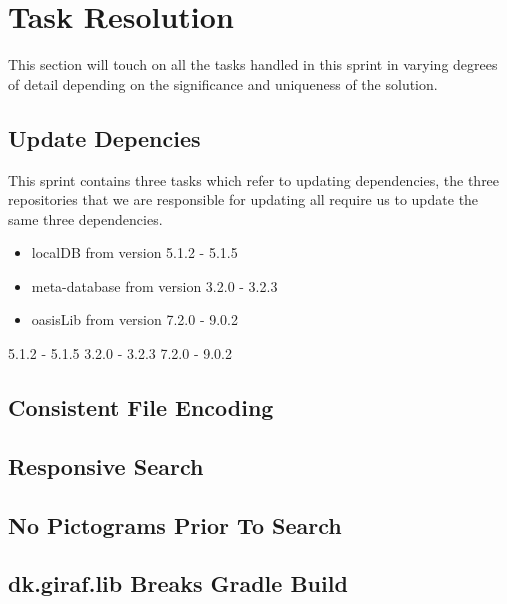 \section{Task Resolution}
This section will touch on all the tasks handled in this sprint in varying degrees of detail depending on the significance and uniqueness of the solution.

\subsection{Update Depencies}
This sprint contains three tasks which refer to updating dependencies, the three repositories that we are responsible for updating all require us to update the same three dependencies.
\begin{itemize}
    \item localDB from version 5.1.2 - 5.1.5
    \item meta-database from version 3.2.0 - 3.2.3
    \item oasisLib from version 7.2.0 - 9.0.2
\end{itemize}


5.1.2 - 5.1.5
3.2.0 - 3.2.3
7.2.0 - 9.0.2
\subsection{Consistent File Encoding}
\subsection{Responsive Search}
\subsection{No Pictograms Prior To Search}
\subsection{dk.giraf.lib Breaks Gradle Build}

